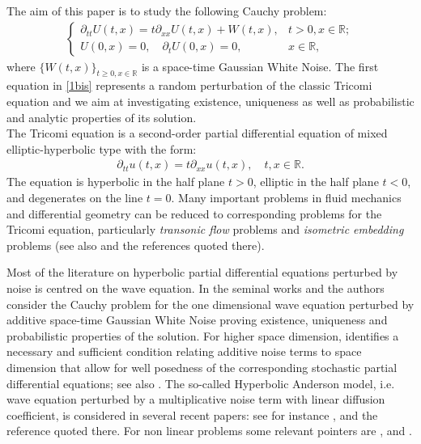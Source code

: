 \documentclass{article}
\begin{document}
The aim of this paper is to study the following Cauchy problem: 
\begin{align}\label{1bis}
\begin{cases}
\partial_{tt} U(t,x)=t\partial_{xx}U(t,x)+W(t,x),& t>0,x\in\mathbb{R};\\
U(0,x)=0,\quad \partial_{t}U(0,x)=0,& x\in\mathbb{R},
\end{cases}
\end{align}
where $\{W(t,x)\}_{t\geq 0,x\in\mathbb{R}}$ is a space-time Gaussian White Noise. The first equation in \eqref{1bis} represents a random perturbation of the classic Tricomi equation and we aim at investigating existence, uniqueness as well as probabilistic and analytic properties of its solution. \\
The Tricomi equation \cite{tricomi} is a second-order partial
differential equation of mixed elliptic-hyperbolic type with the form:
\begin{align}\label{tricomi intro}
\partial_{tt}u(t,x)=t\partial_{xx}u(t,x),\quad t,x\in\mathbb{R}.
\end{align}
The equation is hyperbolic in the half plane $t > 0$, elliptic in the half plane $t < 0$, and degenerates on the line $t = 0$. Many important problems in fluid mechanics and differential geometry can be reduced to corresponding problems for the Tricomi equation, particularly \emph{transonic flow} problems \cite{manwell} and \emph{isometric embedding} problems \cite{Qing} (see also \cite{tricomiintro} and the references quoted there). 

Most of the literature on hyperbolic partial differential equations perturbed by noise is centred on the wave equation. In the seminal works \cite{Walsh} and \cite{Orsingher} the authors consider the Cauchy problem for the one dimensional wave equation perturbed by additive space-time Gaussian White Noise proving existence, uniqueness and probabilistic properties of the solution. For higher space dimension, \cite{Dalang99} identifies a necessary and sufficient condition  relating additive noise terms to space dimension that allow for well posedness of the corresponding stochastic partial differential equations; see also \cite{DalangFrangos}. The so-called Hyperbolic Anderson model, i.e. wave equation perturbed by a multiplicative noise term with linear diffusion coefficient, is considered in several recent papers: see for instance \cite{BalanSong}, \cite{BalanJolis} and the reference quoted there. For non linear problems some relevant pointers are \cite{ConusDalang},\cite{Peszat} and \cite{PeszatZabczyk}. 
\end{document}
